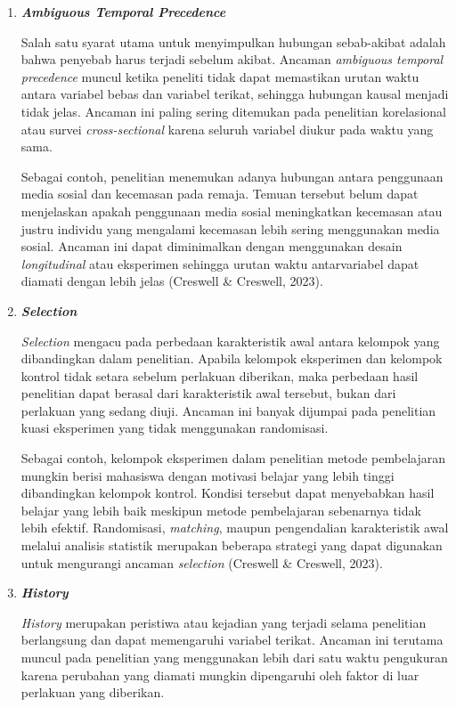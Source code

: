 \documentclass[
  indonesian,
  letterpaper,
  DIV=11,
  numbers=noendperiod]{scrreprt}
\begin{document}
\begin{enumerate}
\def\labelenumi{\arabic{enumi}.}
\item
  \textbf{\emph{Ambiguous Temporal Precedence}}

  Salah satu syarat utama untuk menyimpulkan hubungan sebab-akibat
  adalah bahwa penyebab harus terjadi sebelum akibat. Ancaman
  \emph{ambiguous temporal precedence} muncul ketika peneliti tidak
  dapat memastikan urutan waktu antara variabel bebas dan variabel
  terikat, sehingga hubungan kausal menjadi tidak jelas. Ancaman ini
  paling sering ditemukan pada penelitian korelasional atau survei
  \emph{cross-sectional} karena seluruh variabel diukur pada waktu yang
  sama.

  Sebagai contoh, penelitian menemukan adanya hubungan antara penggunaan
  media sosial dan kecemasan pada remaja. Temuan tersebut belum dapat
  menjelaskan apakah penggunaan media sosial meningkatkan kecemasan atau
  justru individu yang mengalami kecemasan lebih sering menggunakan
  media sosial. Ancaman ini dapat diminimalkan dengan menggunakan desain
  \emph{longitudinal} atau eksperimen sehingga urutan waktu
  antarvariabel dapat diamati dengan lebih jelas (Creswell \& Creswell,
  2023).
\item
  \textbf{\emph{Selection}}

  \emph{Selection} mengacu pada perbedaan karakteristik awal antara
  kelompok yang dibandingkan dalam penelitian. Apabila kelompok
  eksperimen dan kelompok kontrol tidak setara sebelum perlakuan
  diberikan, maka perbedaan hasil penelitian dapat berasal dari
  karakteristik awal tersebut, bukan dari perlakuan yang sedang diuji.
  Ancaman ini banyak dijumpai pada penelitian kuasi eksperimen yang
  tidak menggunakan randomisasi.

  Sebagai contoh, kelompok eksperimen dalam penelitian metode
  pembelajaran mungkin berisi mahasiswa dengan motivasi belajar yang
  lebih tinggi dibandingkan kelompok kontrol. Kondisi tersebut dapat
  menyebabkan hasil belajar yang lebih baik meskipun metode pembelajaran
  sebenarnya tidak lebih efektif. Randomisasi, \emph{matching}, maupun
  pengendalian karakteristik awal melalui analisis statistik merupakan
  beberapa strategi yang dapat digunakan untuk mengurangi ancaman
  \emph{selection} (Creswell \& Creswell, 2023).
\item
  \textbf{\emph{History}}

  \emph{History} merupakan peristiwa atau kejadian yang terjadi selama
  penelitian berlangsung dan dapat memengaruhi variabel terikat. Ancaman
  ini terutama muncul pada penelitian yang menggunakan lebih dari satu
  waktu pengukuran karena perubahan yang diamati mungkin dipengaruhi
  oleh faktor di luar perlakuan yang diberikan.


\end{enumerate}
\end{document}
